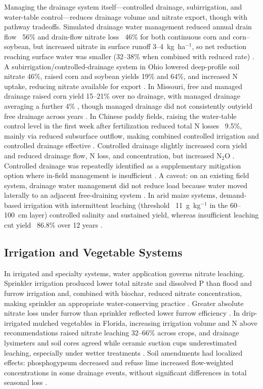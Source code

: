 Managing the drainage system itself---controlled drainage, subirrigation, and water-table control---reduces drainage volume and nitrate export, though with pathway tradeoffs. Simulated drainage water management reduced annual drain flow ~56\% and drain-flow nitrate loss ~46\% for both continuous corn and corn--soybean, but increased nitrate in surface runoff 3--4~kg~ha$^{-1}$, so net reduction reaching surface water was smaller (32--38\% when combined with reduced rate) \parencite{Ale2012b}. A subirrigation/controlled-drainage system in Ohio lowered deep-profile soil nitrate 46\%, raised corn and soybean yields 19\% and 64\%, and increased N uptake, reducing nitrate available for export \parencite{Fisher1999}. In Missouri, free and managed drainage raised corn yield 15--21\% over no drainage, with managed drainage averaging a further 4\% \parencite{Nash2015}, though managed drainage did not consistently outyield free drainage across years \parencite{Nash2015b}. In Chinese paddy fields, raising the water-table control level in the first week after fertilization reduced total N losses ~9.5\%, mainly via reduced subsurface outflow, making combined controlled irrigation and controlled drainage effective \parencite{He2019b}. Controlled drainage slightly increased corn yield and reduced drainage flow, N loss, and concentration, but increased N$_2$O \parencite{Wang2016b}. Controlled drainage was repeatedly identified as a supplementary mitigation option where in-field management is insufficient \parencite{HernandezRamirez2011}. A caveat: on an existing field system, drainage water management did not reduce load because water moved laterally to an adjacent free-draining system \parencite{David2015}. In arid maize systems, demand-based irrigation with intermittent leaching (threshold ~11~g~kg$^{-1}$ in the 60--100~cm layer) controlled salinity and sustained yield, whereas insufficient leaching cut yield ~86.8\% over 12 years \parencite{Liu2024}.

\subsection{Irrigation and Vegetable Systems}

In irrigated and specialty systems, water application governs nitrate leaching. Sprinkler irrigation produced lower total nitrate and dissolved P than flood and furrow irrigation and, combined with biochar, reduced nitrate concentration, making sprinkler an appropriate water-conserving practice \parencite{Farahani2020}. Greater absolute nitrate loss under furrow than sprinkler reflected lower furrow efficiency \parencite{Hurtado2011}. In drip-irrigated mulched vegetables in Florida, increasing irrigation volume and N above recommendations raised nitrate leaching 32--66\% across crops, and drainage lysimeters and soil cores agreed while ceramic suction cups underestimated leaching, especially under wetter treatments \parencite{Zotarelli2007}. Soil amendments had localized effects: phosphogypsum decreased and refuse lime increased flow-weighted concentrations in some drainage events, without significant differences in total seasonal loss \parencite{Hurtado2011}.

